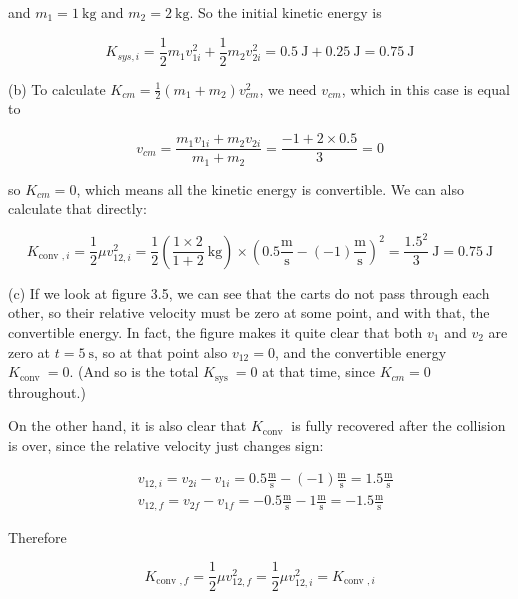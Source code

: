 \documentclass[10pt]{article}
\begin{document}
and $m_{1}=1 \mathrm{~kg}$ and $m_{2}=2 \mathrm{~kg}$. So the initial kinetic energy is


\begin{equation*}
K_{s y s, i}=\frac{1}{2} m_{1} v_{1 i}^{2}+\frac{1}{2} m_{2} v_{2 i}^{2}=0.5 \mathrm{~J}+0.25 \mathrm{~J}=0.75 \mathrm{~J} \tag{4.17}
\end{equation*}


(b) To calculate $K_{c m}=\frac{1}{2}\left(m_{1}+m_{2}\right) v_{c m}^{2}$, we need $v_{c m}$, which in this case is equal to

$$
v_{c m}=\frac{m_{1} v_{1 i}+m_{2} v_{2 i}}{m_{1}+m_{2}}=\frac{-1+2 \times 0.5}{3}=0
$$

so $K_{c m}=0$, which means all the kinetic energy is convertible. We can also calculate that directly:


\begin{equation*}
K_{\text {conv }, i}=\frac{1}{2} \mu v_{12, i}^{2}=\frac{1}{2}\left(\frac{1 \times 2}{1+2} \mathrm{~kg}\right) \times\left(0.5 \frac{\mathrm{m}}{\mathrm{s}}-(-1) \frac{\mathrm{m}}{\mathrm{s}}\right)^{2}=\frac{1.5^{2}}{3} \mathrm{~J}=0.75 \mathrm{~J} \tag{4.18}
\end{equation*}


(c) If we look at figure 3.5, we can see that the carts do not pass through each other, so their relative velocity must be zero at some point, and with that, the convertible energy. In fact, the figure makes it quite clear that both $v_{1}$ and $v_{2}$ are zero at $t=5 \mathrm{~s}$, so at that point also $v_{12}=0$, and the convertible energy $K_{\text {conv }}=0$. (And so is the total $K_{\text {sys }}=0$ at that time, since $K_{c m}=0$ throughout.)

On the other hand, it is also clear that $K_{\text {conv }}$ is fully recovered after the collision is over, since the relative velocity just changes sign:


\begin{align*}
& v_{12, i}=v_{2 i}-v_{1 i}=0.5 \frac{\mathrm{m}}{\mathrm{s}}-(-1) \frac{\mathrm{m}}{\mathrm{s}}=1.5 \frac{\mathrm{m}}{\mathrm{s}} \\
& v_{12, f}=v_{2 f}-v_{1 f}=-0.5 \frac{\mathrm{m}}{\mathrm{s}}-1 \frac{\mathrm{m}}{\mathrm{s}}=-1.5 \frac{\mathrm{m}}{\mathrm{s}} \tag{4.19}
\end{align*}


Therefore

$$
K_{\text {conv }, f}=\frac{1}{2} \mu v_{12, f}^{2}=\frac{1}{2} \mu v_{12, i}^{2}=K_{\text {conv }, i}
$$
\end{document}
